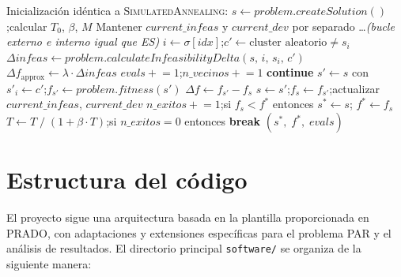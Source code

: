\documentclass[a4paper,12pt]{article}%
\begin{document}
\begin{algorithm}[H]
	\begin{algorithmic}
		\State Inicialización idéntica a \textsc{SimulatedAnnealing}:
		\State \quad $s \leftarrow \textit{problem.createSolution}()$;\quad calcular $T_0$, $\beta$, $M$
		\State Mantener $\textit{current\_infeas}$ y $\textit{current\_dev}$ por separado
		\State \ldots \textit{(bucle externo e interno igual que ES)}
		\State $i \leftarrow \sigma[\textit{idx}]$;\quad $c' \leftarrow \text{cluster aleatorio} \neq s_i$
		\State $\Delta\textit{infeas} \leftarrow \textit{problem.calculateInfeasibilityDelta}(s,\, i,\, s_i,\, c')$
		\State $\Delta f_{\text{approx}} \leftarrow \lambda \cdot \Delta\textit{infeas}$
		\State $\textit{evals} \mathrel{+}= 1$;\quad $\textit{n\_vecinos} \mathrel{+}= 1$
		\State \textbf{continue} 
		\EndIf
		\State $s' \leftarrow s$ con $s'_i \leftarrow c'$;\quad $f_{s'} \leftarrow \textit{problem.fitness}(s')$
		\State $\Delta f \leftarrow f_{s'} - f_s$
		\State $s \leftarrow s'$;\quad $f_s \leftarrow f_{s'}$;\quad actualizar $\textit{current\_infeas}$, $\textit{current\_dev}$
		\State $\textit{n\_exitos} \mathrel{+}= 1$;\quad si $f_s < f^*$ entonces $s^* \leftarrow s$;\; $f^* \leftarrow f_s$
		\EndIf
		\State $T \leftarrow T\;/\;(1+\beta\cdot T)$;\quad si $\textit{n\_exitos}=0$ entonces \textbf{break}
		\EndWhile
		\State \Return $(s^*,\; f^*,\; \textit{evals})$
		\EndFunction
	\end{algorithmic}
\end{algorithm}

\newpage
\section{Estructura del código}

\noindent El proyecto sigue una arquitectura basada en la plantilla proporcionada en PRADO, con adaptaciones y extensiones específicas para el problema PAR y el análisis de resultados. El directorio principal \texttt{software/} se organiza de la siguiente manera:
\end{document}
